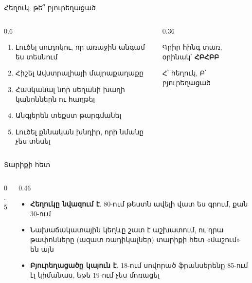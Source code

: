 \begin{frame}{Հեղուկ, թե՞ բյուրեղացած}
  \begin{columns}[c]
    \begin{column}{0.6\textwidth}
      \begin{enumerate}
        \item Լուծել սուդոկու, որ առաջին անգամ ես տեսնում 
        \item Հիշել Ավստրալիայի մայրաքաղաքը 
        \item Հասկանալ նոր սեղանի խաղի կանոններն ու հաղթել 
        \item Անգլերեն տեքստ թարգմանել 
        \item Լուծել քննական խնդիր, որի նմանը չես տեսել 
      \end{enumerate}
    \end{column}
    \begin{column}{0.36\textwidth}
      \begin{chatbox}
        Գրիր հինգ տառ, օրինակ՝ \textbf{ՀԲՀԲԲ}\par\smallskip
        Հ՝ հեղուկ, Բ՝ բյուրեղացած
      \end{chatbox}
    \end{column}
  \end{columns}
\end{frame}

\begin{frame}{Տարիքի հետ}
  \begin{columns}[c]
    \begin{column}{0.5\textwidth}
      \centering
      
    \end{column}
    \begin{column}{0.46\textwidth}
      \begin{itemize}
        \item \textbf{Հեղուկը նվազում է}. 80-ում թեստն ավելի վատ ես գրում, քան 30-ում
        \item<2-> Նախաճակատային կեղևը շատ է աշխատում, ու դրա թափոնները (ազատ ռադիկալներ) տարիքի հետ «մաշում» են այն
        \item<3-> \textbf{Բյուրեղացածը կայուն է}. 18-ում սովորած ֆրանսերենը 85-ում էլ կիմանաս, եթե 19-ում չես մոռացել
      \end{itemize}
    \end{column}
  \end{columns}
\end{frame}

